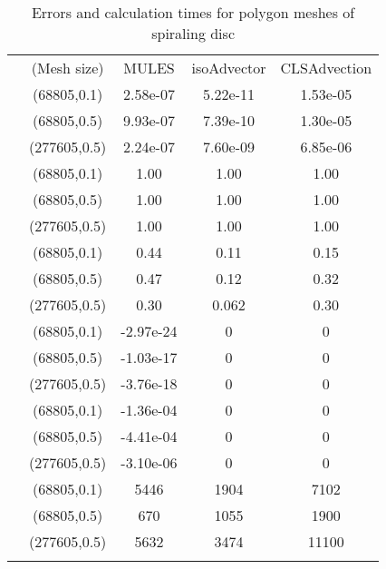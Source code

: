 \begin{table}
\centering
\caption{Errors and calculation times for polygon meshes of spiraling disc}
\label{Tab:05}
\begin{tabular}{ccccc}
\hline\noalign{\smallskip}
\quad &(Mesh size) & MULES &isoAdvector &CLSAdvection  \\
\noalign{\smallskip}\hline\noalign{\smallskip}
\multirow{5}{*}{$\varepsilon_{V}$}
&(68805,0.1)& 2.58e-07 &5.22e-11 &1.53e-05  \\
&(68805,0.5) & 9.93e-07 &7.39e-10 &1.30e-05\\
&(277605,0.5)& 2.24e-07 &7.60e-09 &6.85e-06\\
\hline\noalign{\smallskip}
\multirow{5}{*}{$\varepsilon_{M}$}
&(68805,0.1)& 1.00 &1.00 &1.00  \\
&(68805,0.5) & 1.00 &1.00 &1.00\\
&(277605,0.5)& 1.00 &1.00 &1.00\\
\hline\noalign{\smallskip}
\multirow{5}{*}{$\varepsilon_{S}$}
&(68805,0.1)& 0.44 &0.11 &0.15  \\
&(68805,0.5) & 0.47 &0.12 &0.32\\
&(277605,0.5)& 0.30 &0.062 &0.30\\
\hline\noalign{\smallskip}
\multirow{5}{*}{$\min(\alpha)$}
&(68805,0.1)& -2.97e-24 &0 &0  \\
&(68805,0.5) & -1.03e-17 &0 &0\\
&(277605,0.5)& -3.76e-18 &0 &0\\
\hline\noalign{\smallskip}
\multirow{5}{*}{$\max(\alpha)-1$}
&(68805,0.1)& -1.36e-04 &0 &0  \\
&(68805,0.5) & -4.41e-04 &0 &0\\
&(277605,0.5)& -3.10e-06 &0 &0\\
\hline\noalign{\smallskip}
\multirow{5}{*}{$T_{calc}$}
&(68805,0.1)& 5446 &1904 &7102  \\
&(68805,0.5) & 670 &1055 &1900\\
&(277605,0.5)& 5632 &3474 &11100\\
\noalign{\smallskip}\hline
\end{tabular}
\end{table}
